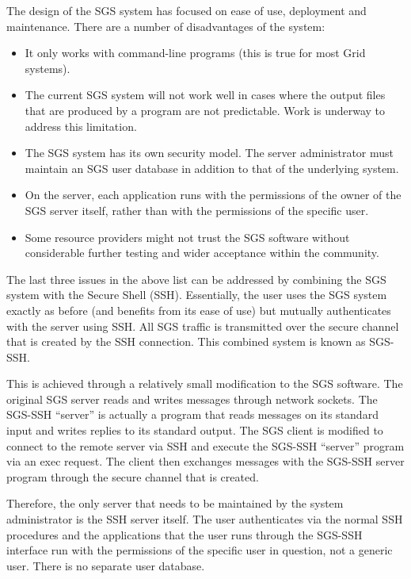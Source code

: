 \documentclass[times,10pt,twocolumn]{article}
\begin{document}
The design of the SGS system has focused on ease of use, deployment and maintenance.  There are a number of disadvantages of the system:
\begin{itemize}
\item It only works with command-line programs (this is true for most Grid systems).
\item The current SGS system will not work well in cases where the output files that are produced by a program are not predictable.  Work is underway to address this limitation.
\item The SGS system has its own security model.  The server administrator must maintain an SGS user database in addition to that of the underlying system.
\item On the server, each application runs with the permissions of the owner of the SGS server itself, rather than with the permissions of the specific user.
\item Some resource providers might not trust the SGS software without considerable further testing and wider acceptance within the community.
\end{itemize}

The last three issues in the above list can be addressed by combining the SGS system with the Secure Shell (SSH).  Essentially, the user uses the SGS system exactly as before (and benefits from its ease of use) but mutually authenticates with the server using SSH.  All SGS traffic is transmitted over the secure channel that is created by the SSH connection.  This combined system is known as SGS-SSH.

This is achieved through a relatively small modification to the SGS software.  The original SGS server reads and writes messages through network sockets.  The SGS-SSH ``server'' is actually a program that reads messages on its standard input and writes replies to its standard output.  The SGS client is modified to connect to the remote server via SSH and execute the SGS-SSH ``server'' program via an exec request.  The client then exchanges messages with the SGS-SSH server program through the secure channel that is created.

Therefore, the only server that needs to be maintained by the system administrator is the SSH server itself.  The user authenticates via the normal SSH procedures and the applications that the user runs through the SGS-SSH interface run with the permissions of the specific user in question, not a generic user.  There is no separate user database.
\end{document}
